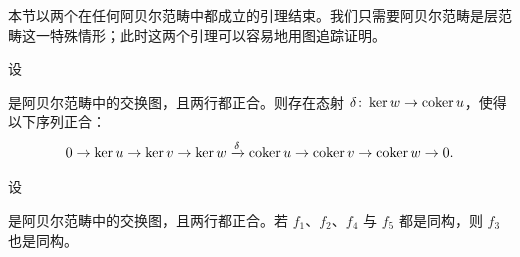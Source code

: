 本节以两个在任何阿贝尔范畴中都成立的引理结束。我们只需要阿贝尔范畴是层范畴这一特殊情形；此时这两个引理可以容易地用图追踪证明。

\begin{lemma}\label{it:1.1.10}
设
\begin{center}
\end{center}
是阿贝尔范畴中的交换图，且两行都正合。则存在态射 $\delta\colon\ker w\to\operatorname{coker} u$，使得以下序列正合：
\[
0\to\ker u\to\ker v\to\ker w\xrightarrow{\delta}\operatorname{coker} u\to\operatorname{coker} v\to\operatorname{coker} w\to 0.
\]
\end{lemma}

\begin{lemma}\label{it:1.1.11}
设
\begin{center}
\end{center}
是阿贝尔范畴中的交换图，且两行都正合。若 $f_1$、$f_2$、$f_4$ 与 $f_5$ 都是同构，则 $f_3$ 也是同构。
\end{lemma}

